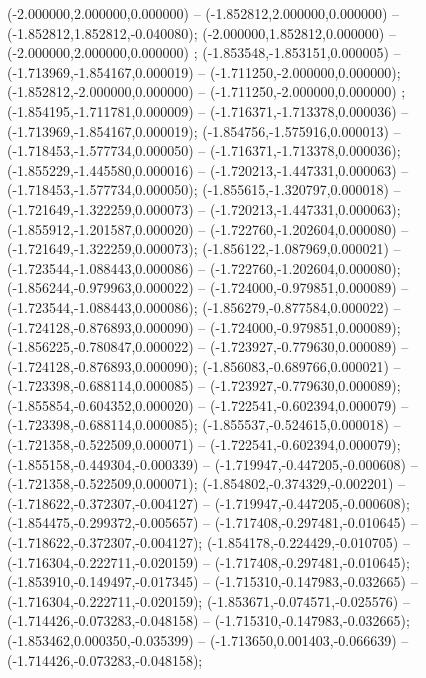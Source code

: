  (-2.000000,2.000000,0.000000) -- (-1.852812,2.000000,0.000000) -- (-1.852812,1.852812,-0.040080);
 (-2.000000,1.852812,0.000000) -- (-2.000000,2.000000,0.000000) ;
 (-1.853548,-1.853151,0.000005) -- (-1.713969,-1.854167,0.000019) -- (-1.711250,-2.000000,0.000000);
 (-1.852812,-2.000000,0.000000) -- (-1.711250,-2.000000,0.000000) ;
 (-1.854195,-1.711781,0.000009) -- (-1.716371,-1.713378,0.000036) -- (-1.713969,-1.854167,0.000019);
 (-1.854756,-1.575916,0.000013) -- (-1.718453,-1.577734,0.000050) -- (-1.716371,-1.713378,0.000036);
 (-1.855229,-1.445580,0.000016) -- (-1.720213,-1.447331,0.000063) -- (-1.718453,-1.577734,0.000050);
 (-1.855615,-1.320797,0.000018) -- (-1.721649,-1.322259,0.000073) -- (-1.720213,-1.447331,0.000063);
 (-1.855912,-1.201587,0.000020) -- (-1.722760,-1.202604,0.000080) -- (-1.721649,-1.322259,0.000073);
 (-1.856122,-1.087969,0.000021) -- (-1.723544,-1.088443,0.000086) -- (-1.722760,-1.202604,0.000080);
 (-1.856244,-0.979963,0.000022) -- (-1.724000,-0.979851,0.000089) -- (-1.723544,-1.088443,0.000086);
 (-1.856279,-0.877584,0.000022) -- (-1.724128,-0.876893,0.000090) -- (-1.724000,-0.979851,0.000089);
 (-1.856225,-0.780847,0.000022) -- (-1.723927,-0.779630,0.000089) -- (-1.724128,-0.876893,0.000090);
 (-1.856083,-0.689766,0.000021) -- (-1.723398,-0.688114,0.000085) -- (-1.723927,-0.779630,0.000089);
 (-1.855854,-0.604352,0.000020) -- (-1.722541,-0.602394,0.000079) -- (-1.723398,-0.688114,0.000085);
 (-1.855537,-0.524615,0.000018) -- (-1.721358,-0.522509,0.000071) -- (-1.722541,-0.602394,0.000079);
 (-1.855158,-0.449304,-0.000339) -- (-1.719947,-0.447205,-0.000608) -- (-1.721358,-0.522509,0.000071);
 (-1.854802,-0.374329,-0.002201) -- (-1.718622,-0.372307,-0.004127) -- (-1.719947,-0.447205,-0.000608);
 (-1.854475,-0.299372,-0.005657) -- (-1.717408,-0.297481,-0.010645) -- (-1.718622,-0.372307,-0.004127);
 (-1.854178,-0.224429,-0.010705) -- (-1.716304,-0.222711,-0.020159) -- (-1.717408,-0.297481,-0.010645);
 (-1.853910,-0.149497,-0.017345) -- (-1.715310,-0.147983,-0.032665) -- (-1.716304,-0.222711,-0.020159);
 (-1.853671,-0.074571,-0.025576) -- (-1.714426,-0.073283,-0.048158) -- (-1.715310,-0.147983,-0.032665);
 (-1.853462,0.000350,-0.035399) -- (-1.713650,0.001403,-0.066639) -- (-1.714426,-0.073283,-0.048158);
